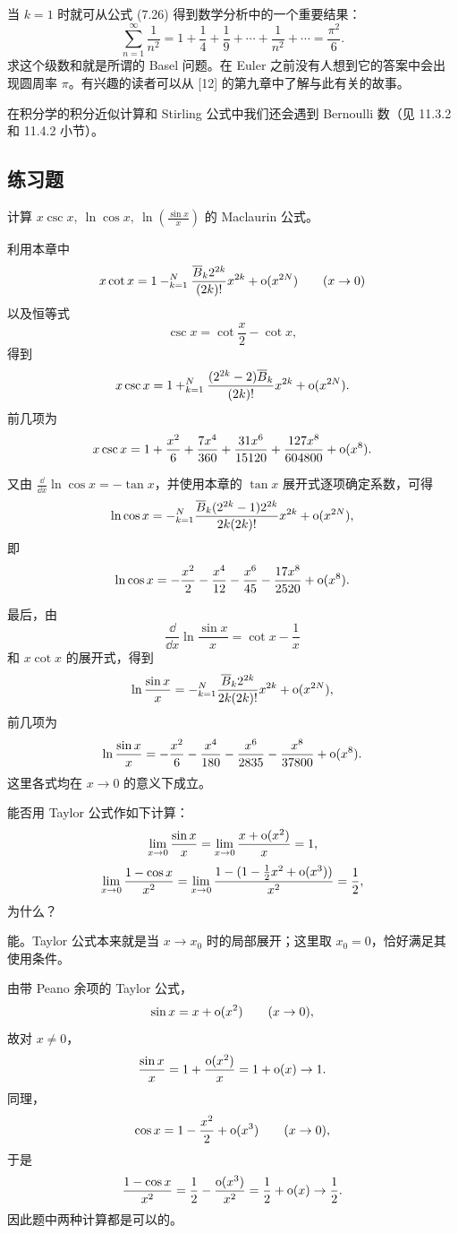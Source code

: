 当 $k=1$ 时就可从公式 (7.26) 得到数学分析中的一个重要结果：
\[
  \sum_{n=1}^{\infty}\frac{1}{n^2}=1+\frac14+\frac19+\cdots+\frac{1}{n^2}+\cdots=\frac{\pi^2}{6}.
\]
求这个级数和就是所谓的 Basel 问题。在 Euler 之前没有人想到它的答案中会出现圆周率 $\pi$。有兴趣的读者可以从 [12] 的第九章中了解与此有关的故事。

在积分学的积分近似计算和 Stirling 公式中我们还会遇到 Bernoulli 数（见 11.3.2 和 11.4.2 小节）。

\subsection{练习题}

\begin{xexercise}[1]
计算 $x\csc x,\ \ln\cos x,\ \ln\left(\frac{\sin x}{x}\right)$ 的 Maclaurin 公式。
\end{xexercise}
\begin{xsolution}
利用本章中
\[
  x\cot x
  =1-\relax_{k=1}^N\frac{\overline B_k2^{2k}}{(2k)!}x^{2k}
  +\mathrm{o}(x^{2N})
  \qquad(x\to0)
\]
以及恒等式
\[
  \csc x=\cot\frac x2-\cot x,
\]
得到
\[
  x\csc x
  =1+\relax_{k=1}^N
  \frac{(2^{2k}-2)\overline B_k}{(2k)!}x^{2k}
  +\mathrm{o}(x^{2N}).
\]
前几项为
\[
  x\csc x
  =1+\frac{x^2}{6}+\frac{7x^4}{360}
  +\frac{31x^6}{15120}+\frac{127x^8}{604800}
  +\mathrm{o}(x^8).
\]

又由 $\frac{\dd}{\dd x}\ln\cos x=-\tan x$，并使用本章的 $\tan x$ 展开式逐项确定系数，可得
\[
  \ln\cos x
  =-\relax_{k=1}^N
  \frac{\overline B_k(2^{2k}-1)2^{2k}}
       {2k(2k)!}x^{2k}
  +\mathrm{o}(x^{2N}),
\]
即
\[
  \ln\cos x
  =-\frac{x^2}{2}-\frac{x^4}{12}-\frac{x^6}{45}
  -\frac{17x^8}{2520}+\mathrm{o}(x^8).
\]

最后，由
\[
  \frac{\dd}{\dd x}\ln\frac{\sin x}{x}
  =\cot x-\frac1x
\]
和 $x\cot x$ 的展开式，得到
\[
  \ln\frac{\sin x}{x}
  =-\relax_{k=1}^N
  \frac{\overline B_k2^{2k}}{2k(2k)!}x^{2k}
  +\mathrm{o}(x^{2N}),
\]
前几项为
\[
  \ln\frac{\sin x}{x}
  =-\frac{x^2}{6}-\frac{x^4}{180}-\frac{x^6}{2835}
  -\frac{x^8}{37800}+\mathrm{o}(x^8).
\]
这里各式均在 $x\to0$ 的意义下成立。
\end{xsolution}


\begin{xexercise}[2]
能否用 Taylor 公式作如下计算：
\[
  \lim_{x\to0}\frac{\sin x}{x}
  =\lim_{x\to0}\frac{x+\mathrm{o}(x^2)}{x}=1,
\]
\[
  \lim_{x\to0}\frac{1-\cos x}{x^2}
  =\lim_{x\to0}\frac{1-(1-\frac12x^2+\mathrm{o}(x^3))}{x^2}=\frac12,
\]
为什么？
\end{xexercise}
\begin{xsolution}
能。Taylor 公式本来就是当 $x\to x_0$ 时的局部展开；这里取 $x_0=0$，恰好满足其使用条件。

由带 Peano 余项的 Taylor 公式，
\[
  \sin x=x+\mathrm{o}(x^2)\qquad(x\to0),
\]
故对 $x\neq0$，
\[
  \frac{\sin x}{x}=1+\frac{\mathrm{o}(x^2)}x=1+\mathrm{o}(x)\to1.
\]
同理，
\[
  \cos x=1-\frac{x^2}{2}+\mathrm{o}(x^3)\qquad(x\to0),
\]
于是
\[
  \frac{1-\cos x}{x^2}
  =\frac12-\frac{\mathrm{o}(x^3)}{x^2}
  =\frac12+\mathrm{o}(x)\to\frac12.
\]
因此题中两种计算都是可以的。
\end{xsolution}


